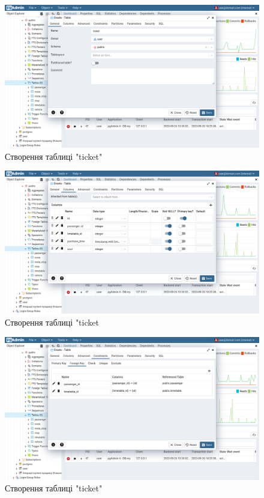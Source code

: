 \documentclass[14pt]{extreport}
\begin{document}
\begin{normalsize}
	\begin{figure}[H]
		\centering
		\includegraphics[scale=0.35]{35}
		\caption{Створення таблиці "ticket"}
	\end{figure}
	
	\begin{figure}[H]
		\centering
		\includegraphics[scale=0.35]{36}
		\caption{Створення таблиці "ticket}
	\end{figure}
	
	\begin{figure}[H]
		\centering
		\includegraphics[scale=0.35]{37}
		\caption{Створення таблиці "ticket"}
	\end{figure}
	

\end{normalsize}
\end{document}
